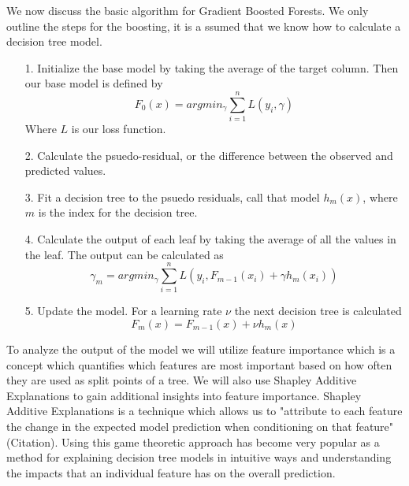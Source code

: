 \documentclass[12pt]{article}
\begin{document}
We now discuss the basic algorithm for Gradient Boosted Forests. We only outline the steps for the boosting, it is a ssumed that we know how to calculate a decision tree model.

\begin{enumerate} \item[1.] Initialize the base model by taking the average of the target column. Then our base model is defined by \begin{equation} F_0(x) = argmin_{\gamma} \sum_{i=1}^{n} L(y_i, \gamma) \end{equation} Where $L$ is our loss function. 

\item[2.] Calculate the psuedo-residual, or the difference between the observed and predicted values. 

\item[3.] Fit a decision tree to the psuedo residuals, call that model $h_m(x)$, where $m$ is the index for the decision tree.

\item[4.] Calculate the output of each leaf by taking the average of all the values in the leaf. The output can be calculated as \begin{equation} \gamma_m = argmin_{\gamma} \sum_{i=1}^{n} L(y_i, F_{m-1}(x_i) + \gamma h_m(x_i)) \end{equation} 

\item[5.] Update the model. For a learning rate $\nu$ the next decision tree is calculated \begin{equation} F_m(x) = F_{m-1}(x) + \nu h_m(x) \end{equation}

\end{enumerate}

To analyze the output of the model we will utilize feature importance which is a concept which quantifies which features are most important based on how often they are used as split points of a tree. We will also use Shapley Additive Explanations to gain additional insights into feature importance. Shapley Additive Explanations is a technique which allows us to "attribute to each feature the change in the expected model prediction when conditioning on that feature" (Citation). Using this game theoretic approach has become very popular as a method for explaining decision tree models in intuitive ways and understanding the impacts that an individual feature has on the overall prediction. \\
\end{document}
